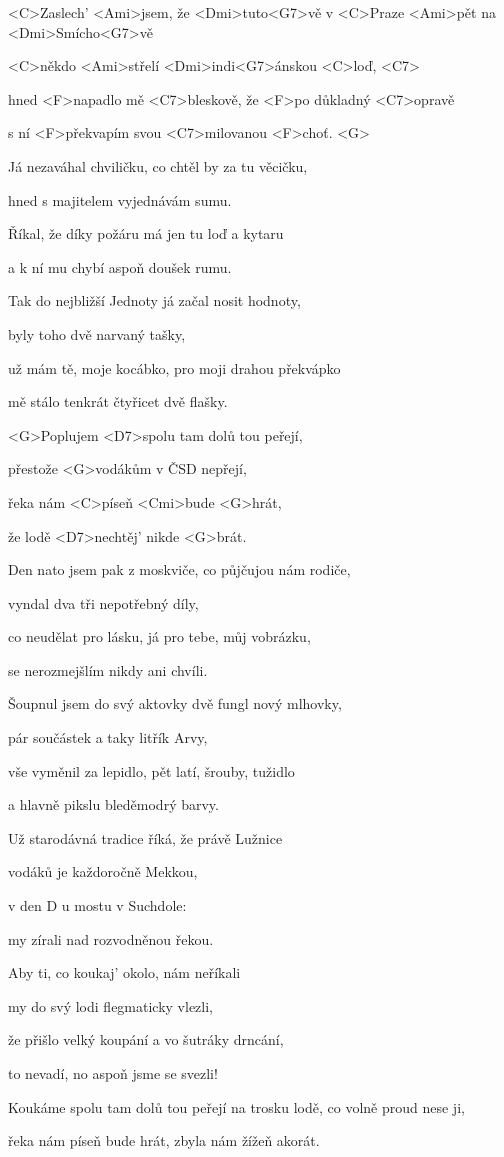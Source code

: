 

\zs
<C>Zaslech' <Ami>jsem, že <Dmi>tuto<G7>vě v <C>Praze <Ami>pět na <Dmi>Smícho<G7>vě

<C>někdo <Ami>střelí <Dmi>indi<G7>ánskou <C>loď, <C7>

hned <F>napadlo mě <C7>bleskově, že <F>po důkladný <C7>opravě

s ní <F>překvapím svou <C7>milovanou <F>choť. <G>
\ks

\zs
Já nezaváhal chviličku, co chtěl by za tu věcičku,

hned s majitelem vyjednávám sumu.

Říkal, že díky požáru má jen tu loď a kytaru

a k ní mu chybí aspoň doušek rumu.
\ks

\zs
Tak do nejbližší Jednoty já začal nosit hodnoty,

byly toho dvě narvaný tašky,

už mám tě, moje kocábko, pro moji drahou překvápko

mě stálo tenkrát čtyřicet dvě flašky.
\ks

\zr
<G>Poplujem <D7>spolu tam dolů tou peřejí,

přestože <G>vodákům v ČSD nepřejí,

řeka nám <C>píseň <Cmi>bude <G>hrát,

že lodě <D7>nechtěj' nikde <G>brát.
\kr

\zs
Den nato jsem pak z moskviče, co půjčujou nám rodiče,

vyndal dva tři nepotřebný díly,

co neudělat pro lásku, já pro tebe, můj vobrázku,

se nerozmejšlím nikdy ani chvíli.
\ks

\zs
Šoupnul jsem do svý aktovky dvě fungl nový mlhovky,

pár součástek a taky litřík Arvy,

vše vyměnil za lepidlo, pět latí, šrouby, tužidlo

a hlavně pikslu bleděmodrý barvy.
\ks

\zs
Už starodávná tradice říká, že právě Lužnice

vodáků je každoročně Mekkou,

v den D u mostu v Suchdole: 

my zírali nad rozvodněnou řekou.
\ks

\zs
Aby ti, co koukaj' okolo, nám neříkali 

my do svý lodi flegmaticky vlezli,

že přišlo velký koupání a vo šutráky drncání,

to nevadí, no aspoň jsme se svezli!
\ks

\zr
Koukáme spolu tam dolů tou peřejí na trosku lodě, co volně proud nese ji,

řeka nám píseň bude hrát, zbyla nám žížeň akorát.
\kr

\kp
